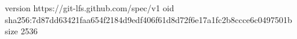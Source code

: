 version https://git-lfs.github.com/spec/v1
oid sha256:7d87dd63421faa654f2184d9edf406f61d8d72f6e17a1fc2b8ccce6c0497501b
size 2536
